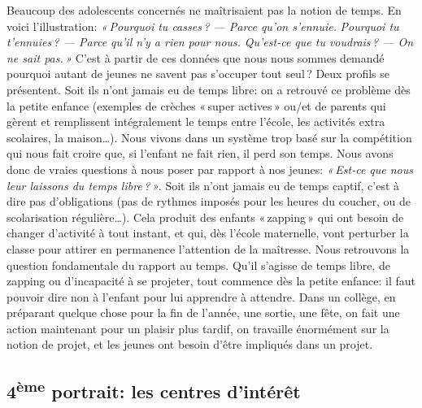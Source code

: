 \documentclass[11pt]{article} %
\begin{document}
  Beaucoup des adolescents concernés ne maîtrisaient pas la notion de temps.\newline
  En voici l'illustration:\newline
  \textit{« Pourquoi tu casses ? --- Parce qu'on s'ennuie.}\newline
  \textit{Pourquoi tu t'ennuies ? --- Parce qu'il n'y a rien pour nous.}\newline
  \textit{Qu'est-ce que tu voudrais ? --- On ne sait pas. »}\newline
  C'est à partir de ces données que nous nous sommes demandé pourquoi autant de jeunes ne savent pas s'occuper tout seul ? Deux profils se présentent.\newline
  Soit ils n'ont jamais eu de temps libre: on a retrouvé ce problème dès la petite enfance (exemples de crèches « super actives » ou/et de parents qui gèrent et remplissent intégralement le temps entre l'école, les activités extra scolaires, la maison\dots). Nous vivons dans un système trop basé sur la compétition qui nous fait croire que, si l'enfant ne fait rien, il perd son temps. Nous avons donc de vraies questions à nous poser par rapport à nos jeunes: \textit{« Est-ce que nous leur laissons du temps libre ? »}.\newline
  Soit ils n'ont jamais eu de temps captif, c'est à dire pas d'obligations (pas de rythmes imposés pour les heures du coucher, ou de scolarisation régulière\dots). Cela produit des enfants « zapping » qui ont besoin de changer d'activité à tout instant, et qui, dès l'école maternelle, vont perturber la classe pour attirer en permanence l'attention de la maîtresse. Nous retrouvons la question fondamentale du rapport au temps. Qu'il s'agisse de temps libre, de zapping ou d'incapacité à se projeter, tout commence dès la petite enfance: il faut pouvoir dire non à l'enfant pour lui apprendre à attendre. Dans un collège, en préparant quelque chose pour la fin de l'année, une sortie, une fête, on fait une action maintenant pour un plaisir plus tardif, on travaille énormément sur la notion de projet, et les jeunes ont besoin d'être impliqués dans un projet.

\subsection{4\textsuperscript{ème} portrait: les centres d'intérêt }
\end{document}
